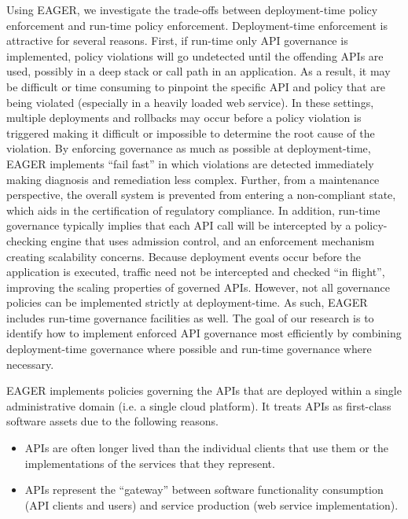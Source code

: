Using EAGER, we investigate the trade-offs between deployment-time policy
enforcement and run-time policy enforcement.
Deployment-time enforcement is attractive for several
reasons.  First, if run-time only API governance is implemented, 
policy violations will go undetected until the offending APIs are used,
possibly in a deep stack or call path in an application.  
As a result, it may be difficult or time consuming to pinpoint the specific
API and policy that are being violated (especially in a heavily loaded web service).
In these settings, multiple deployments and rollbacks may occur before a policy
violation is triggered making it difficult or impossible to determine the root
cause of the violation.  By enforcing governance as much as possible
at deployment-time,
EAGER implements ``fail fast'' in which violations are detected
immediately making diagnosis and remediation less complex.  
Further, from a maintenance perspective,  the overall
system is prevented from entering a non-compliant state, which aids in the
certification of regulatory compliance.  In addition, run-time governance
typically implies that each API call will be intercepted by a policy-checking engine
that uses admission control, and an enforcement mechanism creating scalability
concerns.  Because deployment
events occur before the application is executed,
traffic need not be intercepted and checked ``in flight'', improving the
scaling properties of governed APIs.  However, not all governance policies can be
implemented strictly at deployment-time.  As such, EAGER includes run-time
governance facilities as well.  The goal of our research is to identify how to
implement enforced API governance most efficiently by combining deployment-time  
governance where possible and run-time governance where necessary.


EAGER implements policies governing the APIs that are 
deployed within a single administrative domain (i.e. a single cloud platform). 
It treats APIs as first-class software assets due to the following reasons.
\begin{itemize}
\item APIs are often
longer lived than the individual clients that use them or the implementations
of the services that they represent.
\item APIs represent the
``gateway'' between software functionality consumption 
(API clients and users) and service
production (web service implementation).
\end{itemize}

